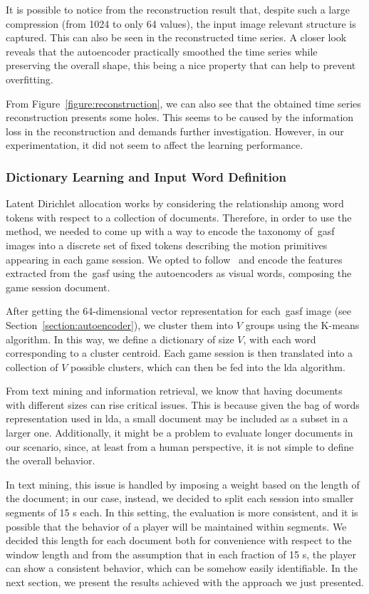 It is possible to notice from the reconstruction result that, despite such a large compression (from 1024 to only 64 values), the input image relevant structure is captured. This can also be seen in the reconstructed time series. A closer look reveals that the autoencoder practically smoothed the time series while preserving the overall shape, this being a nice property that can help to prevent overfitting.

From Figure~\ref{figure:reconstruction}, we can also see that the obtained time series reconstruction presents some holes. This seems to be caused by the information loss in the reconstruction and demands further investigation. However, in our experimentation, it did not seem to affect the learning performance. 

\subsubsection{Dictionary Learning and Input Word Definition}
Latent Dirichlet allocation works by considering the relationship among word tokens with respect to a collection of documents. Therefore, in order to use the method, we needed to come up with a way to encode the taxonomy of~\gls{gasf} images into a discrete set of fixed tokens describing the motion primitives appearing in each game session. We opted to follow~\cite{prince_computer_2012} and encode the features extracted from the~\gls{gasf} using the autoencoders as visual words, composing the game session document.

After getting the 64-dimensional vector representation for each~\gls{gasf} image (see Section~\ref{section:autoencoder}), we cluster them into $V$ groups using the K-means algorithm. In this way, we define a dictionary of size $V$, with each word corresponding to a cluster centroid. Each game session is then translated into a collection of $V$ possible clusters, which can then be fed into the \gls{lda} algorithm.

From text mining and information retrieval, we know that having documents with different sizes can rise critical issues. This is because given the bag of words representation used in \gls{lda}, a small document may be included as a subset in a larger one. Additionally, it might be a problem to evaluate longer documents in our scenario, since, at least from a human perspective, it is not simple to define the overall behavior. %

In text mining, this issue is handled by imposing a weight based on the length of the document; in our case, instead, we decided to split each session into smaller segments of 15 s each. In this setting, the evaluation is more consistent, and it is possible that the behavior of a player will be maintained within segments. We decided this length for each document both for convenience with respect to the window length and from the assumption that in each fraction of 15 s, the player can show a consistent behavior, which can be somehow easily identifiable. In the next section, we present the results achieved with the approach we just presented.

